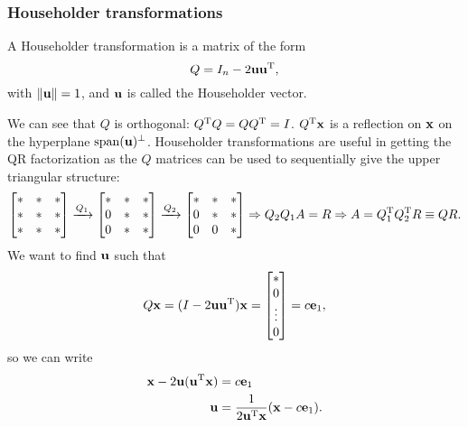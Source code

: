 \documentclass{article}
\begin{document}
\subsubsection{Householder transformations}
\begin{definition}
    A Householder transformation is a matrix of the form 
    \begin{equation}
        Q=I_n-2\bm{\mathrm{uu}}^{\text{T}},
    \end{equation}
    with $\lVert\bm{\mathrm{u}}\rVert=1$, and $\bm{\mathrm{u}}$ is called the Householder vector.
\end{definition}
We can see that $Q$ is orthogonal: $Q^{\text{T}} Q=QQ^{\text{T}}=I$. $Q^{\text{T}}\bm{\mathrm{x}}$ is a reflection on $\bm{\mathrm{x}}$ on the hyperplane $\operatorname{span}(\bm{\mathrm{u}})^{\perp}$. Householder transformations are useful in getting the QR factorization as the $Q$ matrices can be used to sequentially give the upper triangular structure:
\begin{equation}
    \begin{bmatrix}
        \ast & \ast & \ast \\
        \ast & \ast & \ast \\
        \ast & \ast & \ast 
    \end{bmatrix}\xrightarrow{Q_1}
    \begin{bmatrix}
        \ast & \ast & \ast \\
        0    & \ast & \ast \\
        0    & \ast & \ast 
    \end{bmatrix}\xrightarrow{Q_2}
    \begin{bmatrix}
        \ast & \ast & \ast \\
        0    & \ast & \ast \\
        0    & 0    & \ast 
    \end{bmatrix}\Rightarrow Q_2Q_1A=R\Rightarrow A=Q_1^{\text{T}} Q_2^{\text{T}} R\equiv QR.
\end{equation}
We want to find $\bm{\mathrm{u}}$ such that
\begin{equation}
    Q\bm{\mathrm{x}}=(I-2\bm{\mathrm{uu}}^{\text{T}})\bm{\mathrm{x}}=
    \begin{bmatrix}
        \ast\\ 0 \\ \vdots \\0
    \end{bmatrix}=c\bm{\mathrm{e}}_1,
\end{equation}
so we can write
\begin{align}
    \bm{\mathrm{x}}-2\bm{\mathrm{u}}(\bm{\mathrm{u}}^{\text{T}}\bm{\mathrm{x}})&=c\bm{\mathrm{e}}_1\\
    \bm{\mathrm{u}}&=\frac{1}{2\bm{\mathrm{u}}^{\text{T}}\bm{\mathrm{x}}}(\bm{\mathrm{x}}-c\bm{\mathrm{e}}_1).
\end{align}
\end{document}
